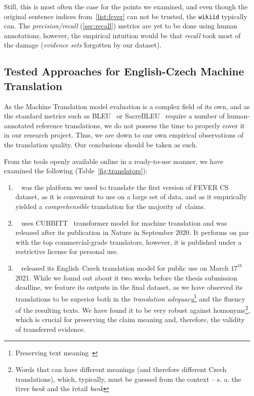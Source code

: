 Still, this is most often the case for the points we examined, and even though the original sentence indices from~\ref{list:fever} can not be trusted, the \texttt{wikiid} typically can. The \textit{precision/recall} (\ref{sec:recall}) metrics are yet to be done using human annotations, however, the empirical intuition would be that \textit{recall} took most of the damage (\textit{evidence sets} \"{forgotten} by our dataset).
\subsection{Tested Approaches for English-Czech Machine Translation}
\label{sub:mach}
As the Machine Translation model evaluation is a complex field of its own, and as the standard metrics such as BLEU~\cite{bleu} or SacreBLEU~\cite{sacrebleu} require a number of human-annotated reference translations, we do not possess the time to properly cover it in our research project. Thus, we are down to our own empirical observations of the translation quality. Our conclusions should be taken as such.

From the tools openly available online in a ready-to-use manner, we have examined the following (Table~\ref{fig:translators}):

\begin{enumerate}
    \item {}~\cite{google} was the platform we used to translate the first version of FEVER CS dataset, as it is convenient to use on a large set of data, and as it empirically yielded a \textit{comprehensible} translation for the majority of~claims.
    \item {}~\cite{lindat} uses {\textsf{CUBBITT}}~\cite{Popel2020} transformer model for machine translation and was released after its publication in \textsf{Nature} in September 2020. It performs on par with the top commercial-grade translators, however, it is published under a restrictive license for personal use.
    \item {}~\cite{deepl} released its English--Czech translation model for public use on March $17^{th}$ 2021. While we found out about it two weeks before the thesis submission deadline, we feature its outputs in the final dataset, as we have observed its translations to be superior both in the \textit{translation adequacy}\footnote{Preserving text meaning~\cite{Popel2020}} and the fluency of the resulting texts. We have found it to be very robust against homonyms\footnote{Words that can have different meanings (and therefore different Czech translations), which, typically, must be guessed from the context -- s. a. the \"{river \textit{bank}} and the \"{retail \textit{bank}}}, which is crucial for preserving the claim meaning and, therefore, the validity of transferred evidence.
\end{enumerate}

